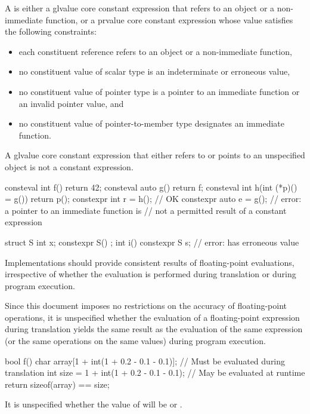 \pnum
A  is either
a glvalue core constant expression that refers to
an object or a non-immediate function, or
a prvalue core constant expression whose value
satisfies the following constraints:
\begin{itemize}
\item
each constituent reference refers to an object or a non-immediate function,
\item
no constituent value of scalar type is an indeterminate or erroneous value,
\item
no constituent value of pointer type is a pointer to an immediate function or
an invalid pointer value, and
\item
no constituent value of pointer-to-member type designates an immediate function.
\end{itemize}
\begin{note}
A glvalue core constant expression
that either refers to or points to an unspecified object
is not a constant expression.
\end{note}
\begin{example}
\begin{codeblock}
consteval int f() { return 42; }
consteval auto g() { return f; }
consteval int h(int (*p)() = g()) { return p(); }
constexpr int r = h();                          // OK
constexpr auto e = g();                         // error: a pointer to an immediate function is
                                                // not a permitted result of a constant expression

struct S {
  int x;
  constexpr S() {}
};
int i() {
  constexpr S s;                                // error:  has erroneous value
}
\end{codeblock}
\end{example}

\pnum
\recommended
Implementations should provide consistent results of floating-point evaluations,
irrespective of whether the evaluation is performed
during translation or during program execution.
\begin{note}
Since this document
imposes no restrictions on the accuracy of floating-point operations, it is unspecified whether the
evaluation of a floating-point expression during translation yields the same result as the
evaluation of the same expression (or the same operations on the same values) during program
execution.
\begin{example}
\begin{codeblock}
bool f() {
    char array[1 + int(1 + 0.2 - 0.1 - 0.1)];   // Must be evaluated during translation
    int size = 1 + int(1 + 0.2 - 0.1 - 0.1);    // May be evaluated at runtime
    return sizeof(array) == size;
}
\end{codeblock}
It is unspecified whether the value of  will be  or .
\end{example}
\end{note}

